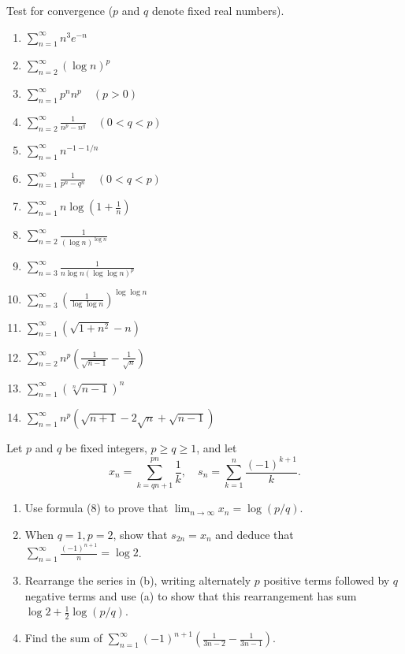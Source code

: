     \begin{problembox}
    Test for convergence (\(p\) and \(q\) denote fixed real numbers).
    \begin{enumerate}[label=(\alph*)]
    \item \(\sum_{n=1}^{\infty} n^3 e^{-n}\)
    \item \(\sum_{n=2}^{\infty} (\log n)^p\)
    \item \(\sum_{n=1}^{\infty} p^n n^p \quad (p > 0)\)
    \item \(\sum_{n=2}^{\infty} \frac{1}{n^p - n^q} \quad (0 < q < p)\)
    \item \(\sum_{n=1}^{\infty} n^{-1-1/n}\)
    \item \(\sum_{n=1}^{\infty} \frac{1}{p^n - q^n} \quad (0 < q < p)\)
    \item \(\sum_{n=1}^{\infty} n \log \left(1 + \frac{1}{n}\right)\)
    \item \(\sum_{n=2}^{\infty} \frac{1}{(\log n)^{\log n}}\)
    \item \(\sum_{n=3}^{\infty} \frac{1}{n \log n (\log \log n)^p}\)
    \item \(\sum_{n=3}^{\infty} \left( \frac{1}{\log \log n} \right)^{\log \log n}\)
    \item \(\sum_{n=1}^{\infty} (\sqrt{1 + n^2} - n)\)
    \item \(\sum_{n=2}^{\infty} n^p \left( \frac{1}{\sqrt{n - 1}} - \frac{1}{\sqrt{n}} \right)\)
    \item \(\sum_{n=1}^{\infty} (\sqrt[n]{n - 1})^n\)
    \item \(\sum_{n=1}^{\infty} n^p (\sqrt{n + 1} - 2\sqrt{n} + \sqrt{n - 1})\)
    \end{enumerate}
    \end{problembox}
    
    \begin{problembox}
    Let \(p\) and \(q\) be fixed integers, \(p \geq q \geq 1\), and let
    \[x_n = \sum_{k=qn+1}^{pn} \frac{1}{k}, \quad s_n = \sum_{k=1}^{n} \frac{(-1)^{k+1}}{k}.\]
    \begin{enumerate}[label=(\alph*)]
    \item Use formula (8) to prove that \(\lim_{n \to \infty} x_n = \log(p/q)\).
    \item When \(q = 1, p = 2\), show that \(s_{2n} = x_n\) and deduce that \(\sum_{n=1}^{\infty} \frac{(-1)^{n+1}}{n} = \log 2\).
    \item Rearrange the series in (b), writing alternately \(p\) positive terms followed by \(q\) negative terms and use (a) to show that this rearrangement has sum \(\log 2 + \frac{1}{2} \log(p/q)\).
    \item Find the sum of \(\sum_{n=1}^{\infty} (-1)^{n+1} \left( \frac{1}{3n - 2} - \frac{1}{3n - 1} \right)\).
    \end{enumerate}
    \end{problembox}
    
